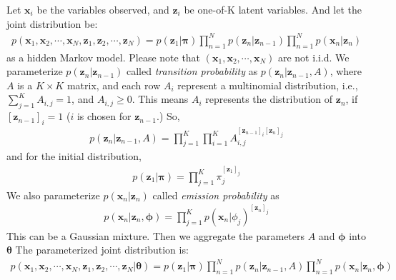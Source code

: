 \documentclass[a4]{article}
\begin{document}
Let $\bm{x}_i$ be the variables observed, and $\bm{z}_i$ be one-of-K latent variables.
And let the joint distribution be:
\begin{equation}
\begin{aligned}
p(\bm{x}_1, \bm{x}_2, \cdots, \bm{x}_N, \bm{z}_1, \bm{z}_2, \cdots, \bm{z}_N) = 
p(\bm{z}_1| \bm{\pi})\prod_{n=1}^N p(\bm{z}_n|\bm{z}_{n-1})\prod_{n=1}^N p(\bm{x}_n|\bm{z}_{n})
\label{eq:chain_model}
\end{aligned}
\end{equation}
as a hidden Markov model.
Please note that $(\bm{x}_1, \bm{x}_2, \cdots, \bm{x}_N)$ are not i.i.d.
We parameterize $p(\bm{z}_n|\bm{z}_{n-1})$ called \textit{transition probability} as $p(\bm{z}_n|\bm{z}_{n-1}, A)$,
where $A$ is a $K \times K$ matrix, and each row $A_i$ represent a multinomial distribution, i.e.,
$\sum_{j=1}^K A_{i,j} = 1$, and $A_{i,j} \ge 0$. This means $A_i$ represents the distribution of $\bm{z}_n$, 
if $[\bm{z}_{n-1}]_i =1$ ($i$ is chosen for $\bm{z}_{n-1}$.)
So, 
\begin{equation}
\begin{aligned}
p(\bm{z}_n|\bm{z}_{n-1}, A) = \prod_{j=1}^K\prod_{i=1}^K A_{i,j}^{[\bm{z}_{n-1}]_i[\bm{z}_{n}]_j}
\end{aligned}
\end{equation}
and for the initial distribution,
\begin{equation}
\begin{aligned}
p(\bm{z}_1|\bm{\pi}) = \prod_{j=1}^K {\pi}_j^{[\bm{z}_1]_j}
\end{aligned}
\end{equation}
We also parameterize $p(\bm{x}_n|\bm{z}_{n})$ called \textit{emission probability} as 
\begin{equation}
\begin{aligned}
p(\bm{x}_n|\bm{z}_{n}, \bm{\phi}) = \prod_{j=1}^K p(\bm{x}_n|\phi_{j})^{[\bm{z}_n]_j}
\end{aligned}
\end{equation}
This can be a Gaussian mixture.
Then we aggregate the parameters $A$ and $\bm{\phi}$ into $\bm{\theta}$
The parameterized joint distribution is:
\begin{equation}
\begin{aligned}
p(\bm{x}_1, \bm{x}_2, \cdots, \bm{x}_N, \bm{z}_1, \bm{z}_2, \cdots, \bm{z}_N|\bm{\theta}) = 
p(\bm{z}_1| \bm{\pi})\prod_{n=1}^N p(\bm{z}_n|\bm{z}_{n-1},A)\prod_{n=1}^N p(\bm{x}_n|\bm{z}_{n}, \bm{\phi})
\label{eq:chain_discrete}
\end{aligned}
\end{equation}
\end{document}
